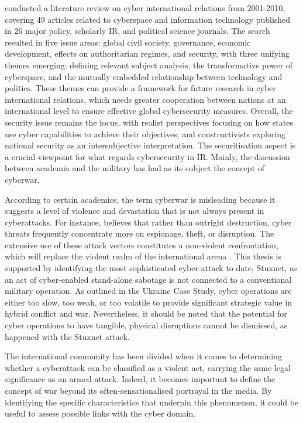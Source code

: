 \textcite{reardon_2012_the} conducted a literature review on cyber international relations from 2001-2010, covering 49 articles related to cyberspace and information technology published in 26 major policy, scholarly IR, and political science journals. The search resulted in five issue areas: global civil society, governance, economic development, effects on authoritarian regimes, and security, with three unifying themes emerging: defining relevant subject analysis, the transformative power of cyberspace, and the mutually embedded relationship between technology and politics. These themes can provide a framework for future research in cyber international relations, which needs greater cooperation between nations at an international level to ensure effective global cybersecurity measures. Overall, the security issue remains the focus, with realist perspectives focusing on how states use cyber capabilities to achieve their objectives, and constructivists exploring national security as an intersubjective interpretation.
The securitisation aspect is a crucial viewpoint for what regards cybersecurity in IR. Mainly, the discussion between academia and the military has had as its subject the concept of cyberwar. 

According to certain academics, the term cyberwar is misleading because it suggests a level of violence and devastation that is not always present in cyberattacks. For instance, \textcite{rid_2017_cyber} believes that rather than outright destruction, cyber threats frequently concentrate more on espionage, theft, or disruption. The extensive use of these attack vectors constitutes a non-violent confrontation, which will replace the violent realm of the international arena \autocite{rid_2017_cyber}. This thesis is supported by identifying the most sophisticated cyber-attack to date, Stuxnet, as an act of cyber-enabled stand-alone sabotage is not connected to a conventional military operation. As \textcite{maschmeyer_2022_goodbye} outlined in the Ukraine Case Study, cyber operations are either too slow, too weak, or too volatile to provide significant strategic value in hybrid conflict and war. Nevertheless, it should be noted that the potential for cyber operations to have tangible, physical disruptions cannot be dismissed, as happened with the Stuxnet attack.

The international community has been divided when it comes to determining whether a cyberattack can be classified as a violent act, carrying the same legal significance as an armed attack. Indeed, it becomes important to define the concept of war beyond its often-sensationalised portrayal in the media. By identifying the specific characteristics that underpin this phenomenon, it could be useful to assess possible links with the cyber domain.


